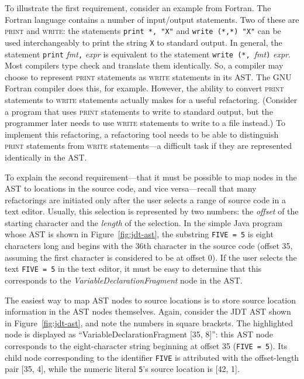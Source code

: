 \documentclass[prodmode]{acmlarge}
\newcommand{\ttt}[1]{\texttt{#1}}
\begin{document}
To illustrate the first requirement, consider an example from Fortran.  The
Fortran language contains a number of input/output statements.  Two of these
are \textsc{print} and \textsc{write}: the statements \ttt{print *, "X"} and
\ttt{write (*,*) "X"} can be used interchangeably to print the string \ttt{X}
to standard output.  In general, the statement \ttt{print} \textit{fmt}\ttt{,}
\textit{expr} is equivalent to the statement \ttt{write (*,
}\textit{fmt}\ttt{)} \textit{expr}.  Most compilers type check and translate
them identically.  So, a compiler may choose to represent \textsc{print}
statements as \textsc{write} statements in its AST.  The GNU Fortran compiler
does this, for example.  However, the ability to convert \textsc{print}
statements to \textsc{write} statements actually makes for a useful
refactoring.  (Consider a program that uses \textsc{print} statements to write
to standard output, but the programmer later needs to use \textsc{write}
statements to write to a file instead.) To implement this refactoring, a
refactoring tool needs to be able to distinguish \textsc{print} statements from
\textsc{write} statements---a difficult task if they are represented
identically in the AST.

To explain the second requirement---that it must be possible to map nodes in
the AST to locations in the source code, and vice versa---recall that many
refactorings are initiated only after the user selects a range of source code
in a text editor.  Usually, this selection is represented by two numbers: the
\textit{offset} of the starting character and the \textit{length} of the
selection.  In the simple Java program whose AST is shown in
Figure~\ref{fig:jdt-ast}, the substring \ttt{FIVE = 5} is eight characters long
and begins with the 36th character in the source code (offset 35, assuming the
first character is considered to be at offset 0).  If the user selects the text
\ttt{FIVE = 5} in the text editor, it must be easy to determine that this
corresponds to the \textit{VariableDeclarationFragment} node in the AST.

The easiest way to map AST nodes to source locations is to store source
location information in the AST nodes themselves.  Again, consider the JDT AST
shown in Figure~\ref{fig:jdt-ast}, and note the numbers in square brackets.
The highlighted node is displayed as ``VariableDeclarationFragment [35, 8]'':
this AST node corresponds to the eight-character string beginning at offset 35
(\ttt{FIVE = 5}).  Its child node corresponding to the identifier \ttt{FIVE} is
attributed with the offset-length pair [35, 4], while the numeric literal
\ttt{5}'s source location is [42, 1].
\end{document}
